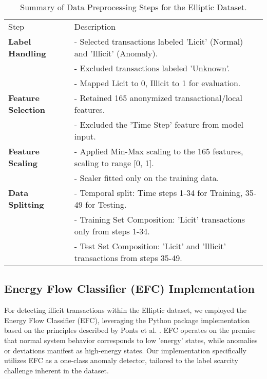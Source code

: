 \documentclass[12pt]{article}
\begin{document}
\begin{table}[htbp]
  \centering
  \caption{Summary of Data Preprocessing Steps for the Elliptic Dataset.}
  \label{tab:preprocessing_summary}
  \begin{tabular}{ll}
    \hline
    Step                  & Description \\
    \textbf{Label Handling} & - Selected transactions labeled 'Licit' (Normal) and 'Illicit' (Anomaly). \\
                          & - Excluded transactions labeled 'Unknown'. \\
                          & - Mapped Licit to 0, Illicit to 1 for evaluation. \\
    \textbf{Feature Selection} & - Retained 165 anonymized transactional/local features. \\
                             & - Excluded the 'Time Step' feature from model input. \\
    \textbf{Feature Scaling}  & - Applied Min-Max scaling to the 165 features, scaling to range [0, 1]. \\
                             & - Scaler fitted only on the training data. \\
    \textbf{Data Splitting}   & - Temporal split: Time steps 1-34 for Training, 35-49 for Testing. \\
                             & - Training Set Composition: 'Licit' transactions only from steps 1-34. \\
                             & - Test Set Composition: 'Licit' and 'Illicit' transactions from steps 35-49. \\
  \end{tabular}
\end{table}

\subsection{Energy Flow Classifier (EFC) Implementation} \label{subsec:efc_implementation}

For detecting illicit transactions within the Elliptic dataset, we employed the Energy Flow Classifier (EFC), leveraging
the Python package implementation \cite{efc_package_github} based on the principles described by Ponts et al.
\cite{pontes2019, souza2022novelopensetenergybased}. EFC operates on the premise that normal system behavior corresponds
to low 'energy' states, while anomalies or deviations manifest as high-energy states. Our implementation specifically
utilizes EFC as a one-class anomaly detector, tailored to the label scarcity challenge inherent in the dataset.
\end{document}
